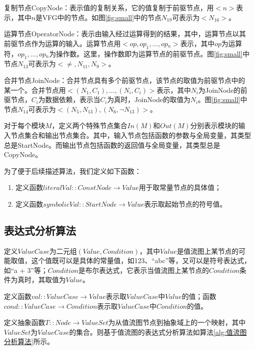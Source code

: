 复制节点CopyNode：表示值的复制关系，它的值复制于前驱节点，用$ <n> $表示，其中$ n $是VFG中的节点。如图\ref{fig:small}中的节点$ N_{19} $可表示为$ <N_{16}> $。

运算节点OperatorNode：表示由输入经过运算得到的结果，其中，运算节点以其前驱节点作为运算的输入。运算节点用$ <op, op_1, …, op­_n> $表示，其中$ op $为运算符，$ op_1, …, op­_n $为操作数。这里，操作数即为运算节点的前驱节点。图\ref{fig:small}中节点$ N_{13} $可表示为$ <≠, N_{11}, N_{9}> $。

合并节点JoinNode：合并节点具有多个前驱节点，该节点的取值为前驱节点中的某一个。合并节点用$ <(N_1, C_1), …, (N_i, C_i)> $表示，其中$ N_i $为JoinNode的前驱节点，$ C_i $为数据依赖，表示当$ C_i $为真时，JoinNode的取值为$ N_i $。图\ref{fig:small}中节点$ N_{14} $可表示为$ <(N_5, N_{13}), (N_6, ¬N_{13})> $。

对于每个模块$ M $，定义两个特殊节点集合$ In(M) $和$ Out(M) $分别表示模块的输入节点集合和输出节点集合。其中，输入节点包括函数的参数与全局变量，其类型总是StartNode。而输出节点包括函数的返回值与全局变量，其类型总是CopyNode。

为了便于后续描述算法，我们定义如下函数：
\begin{enumerate}
	\item 定义函数$ literalVal::ConstNode \rightarrow Value $用于取常量节点的具体值；
	\item 定义函数$ symbolicVal::StartNode \rightarrow Value $表示取起始节点的符号值。
\end{enumerate}

\subsection{表达式分析算法}

定义$ ValueCase $为二元组$  (Value, Condition) $，其中$ Value $是值流图上某节点的可能取值，这个值既可以是具体的常量值，如123、“abc”等，又可以是符号表达式，如“a + 3”等；$ Condition $是布尔表达式，它表示当值流图上某节点的$ Condition $条件为真时，其取值为$ Value $。

定义函数$ val::ValueCase \rightarrow Value $表示取$ ValueCase $中$ Value $的值；函数$ cond::ValueCase \rightarrow Condition $表示取$ ValueCase $中$ Condition $的值。

定义抽象函数$ T::Node \rightarrow ValueSet $为从值流图节点到抽象域上的一个映射，其中$ ValueSet $为$ ValueCase $的集合。则基于值流图的表达式分析算法如算法\ref{alg:值流图分析算法}所示。

